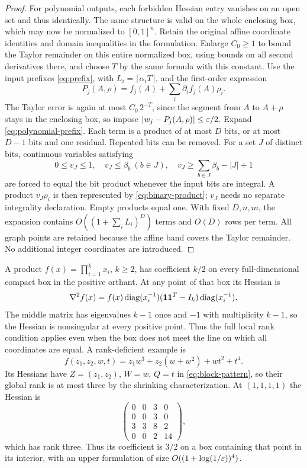 \begin{proof}
For polynomial outputs, each forbidden Hessian entry vanishes on an
open set and thus identically. The same structure is valid on the
whole enclosing box, which may now be normalized to $[0,1]^n$.
Retain the original affine coordinate identities and domain
inequalities in the formulation. Enlarge $C_0\ge1$ to bound the Taylor
remainder on this entire normalized box, using bounds on all second
derivatives there, and choose $T$ by the same formula with this constant.
Use the input prefixes \eqref{eq:prefix}, with
$L_i=\lceil\alpha_iT\rceil$, and the first-order expression
\begin{equation}\label{eq:polynomial-prefix}
 P_j(A,\rho)=f_j(A)+\sum_i\partial_i f_j(A)\rho_i.
\end{equation}
The Taylor error is again at most $C_0\,2^{-T}$, since the segment
from $A$ to $A+\rho$ stays in the enclosing box, so impose
$|w_j-P_j(A,\rho)|\le\varepsilon/2$. Expand \eqref{eq:polynomial-prefix}.
Each term is a product of at most $D$ bits, or at most $D-1$ bits and
one residual. Repeated bits can be removed. For a set $J$ of distinct
bits, continuous variables satisfying
\[
 0\le v_J\le1,\quad v_J\le\beta_b\ (b\in J),\quad
 v_J\ge\sum_{b\in J}\beta_b-|J|+1
\]
are forced to equal the bit product whenever the input bits are integral.
A product $v_J\rho_i$ is then represented by
\eqref{eq:binary-product}; $v_J$ needs no separate integrality declaration.
Empty products equal one. With fixed $D,n,m$, the expansion contains
$O((1+\sum_iL_i)^D)$ terms and $O(D)$ rows per term. All graph points
are retained because the affine band covers the Taylor remainder.
No additional integer coordinates are introduced.
\end{proof}

A product $f(x)=\prod_{i=1}^k x_i$, $k\ge2$, has coefficient $k/2$
on every full-dimensional compact box in the positive orthant. At any
point of that box its Hessian is
\[
 \nabla^2f(x)=f(x)\operatorname{diag}(x_i^{-1})
                 (\mathbf1\mathbf1^T-I_k)\operatorname{diag}(x_i^{-1}).
\]
The middle matrix has eigenvalues $k-1$ once and $-1$ with multiplicity
$k-1$, so the Hessian is nonsingular at every positive point. Thus the
full local rank condition applies even when the box does not meet the
line on which all coordinates are equal.
A rank-deficient example is
\[
 f(z_1,z_2,w,t)=z_1w^3+z_2(w+w^2)+wt^2+t^4.
\]
Its Hessians have $Z=(z_1,z_2)$, $W=w$, $Q=t$ in
\eqref{eq:block-pattern}, so their global rank is at most three by the
shrinking characterization. At $(1,1,1,1)$ the Hessian is
\[
 \begin{pmatrix}0&0&3&0\\0&0&3&0\\3&3&8&2\\0&0&2&14\end{pmatrix},
\]
which has rank three. Thus its coefficient is $3/2$ on a box containing
that point in its interior, with an upper formulation of size
$O((1+\log(1/\varepsilon))^4)$.

